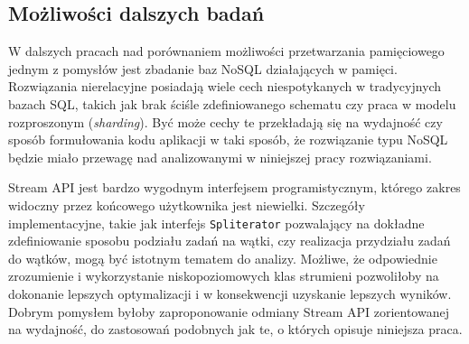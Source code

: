 \documentclass[12pt,twoside,openright]{extarticle}
\begin{document}
\subsection{Możliwości dalszych badań}

    W dalszych pracach nad porównaniem możliwości przetwarzania pamięciowego jednym z pomysłów jest zbadanie baz NoSQL działających w pamięci. Rozwiązania nierelacyjne posiadają wiele cech niespotykanych w tradycyjnych bazach SQL, takich jak brak ściśle zdefiniowanego schematu czy praca w modelu rozproszonym (\textit{sharding}). Być może cechy te przekładają się na wydajność czy sposób formułowania kodu aplikacji w taki sposób, że rozwiązanie typu NoSQL będzie miało przewagę nad analizowanymi w niniejszej pracy rozwiązaniami.

    Stream API jest bardzo wygodnym interfejsem programistycznym, którego zakres widoczny przez końcowego użytkownika jest niewielki. Szczegóły implementacyjne, takie jak interfejs \texttt{Spliterator} pozwalający na dokładne zdefiniowanie sposobu podziału zadań na wątki, czy realizacja przydziału zadań do wątków, mogą być istotnym tematem do analizy. Możliwe, że odpowiednie zrozumienie i wykorzystanie niskopoziomowych klas strumieni pozwoliłoby na dokonanie lepszych optymalizacji i w konsekwencji uzyskanie lepszych wyników. Dobrym pomysłem byłoby zaproponowanie odmiany Stream API zorientowanej na wydajność, do zastosowań podobnych jak te, o których opisuje niniejsza praca.
\end{document}
